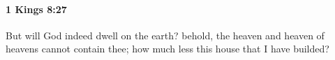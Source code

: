 
		\paragraph{1 Kings 8:27} %
			\label{1KINGS-8-27}

			But will God indeed dwell on the earth? behold, the heaven and heaven of heavens cannot contain thee; how much less this house that I have builded?


